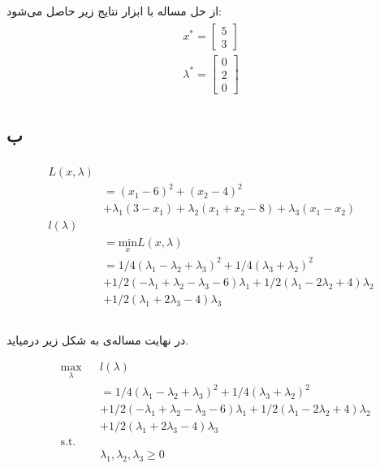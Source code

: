 \documentclass[paper=a4, fontsize=11pt]{article}
\numberwithin{equation}{section} %
\numberwithin{figure}{section} %
\numberwithin{table}{section} %
\begin{document}
\paragraph{}
از حل مساله با ابزار  نتایج زیر حاصل می‌شود:
\begin{align}
	\begin{split}
		x^* = \left[
			\begin{array}{c}
				5 \\ 3
			\end{array}
		\right] \\
		\lambda^* = \left[
			\begin{array}{c}
				0 \\ 2 \\ 0
			\end{array}
		\right]
	\end{split}
\end{align}

\subsection{ب}
\begin{align}
	\begin{split}
		L(x, \lambda)\\
		&= (x_1 - 6)^2 + (x_2 - 4)^2\\
		&+ \lambda_1 (3 - x_1) + \lambda_2 (x_1 + x_2 - 8) + \lambda_3 (x_1 - x_2)\\
		l(\lambda)\\
		&= \underset{x}{\text{min}}L(x, \lambda)\\
		&= 1/4(\lambda_1-\lambda_2+\lambda_3)^2 + 1/4(\lambda_3+\lambda_2)^2 \\
		&+ 1/2(-\lambda_1+\lambda_2-\lambda_3-6)\lambda_1 + 1/2(\lambda_1-2\lambda_2+4)\lambda_2 \\
		&+ 1/2(\lambda_1+2\lambda_3-4)\lambda_3 \\
	\end{split}
\end{align}
\paragraph{}
در نهایت مساله‌ی  به شکل زیر درمیاید.

\begin{equation}
	\begin{aligned}
		& \underset{\lambda}{\text{max}}
		& & l(\lambda) \\
		& & &= 1/4(\lambda_1-\lambda_2+\lambda_3)^2 + 1/4(\lambda_3+\lambda_2)^2 \\
		& & &+ 1/2(-\lambda_1+\lambda_2-\lambda_3-6)\lambda_1 + 1/2(\lambda_1-2\lambda_2+4)\lambda_2 \\
		& & &+ 1/2(\lambda_1+2\lambda_3-4)\lambda_3 \\
		& \text{s.t.} \\
		& & & \lambda_1, \lambda_2, \lambda_3 \ge 0
	\end{aligned}
\end{equation}
\end{document}
